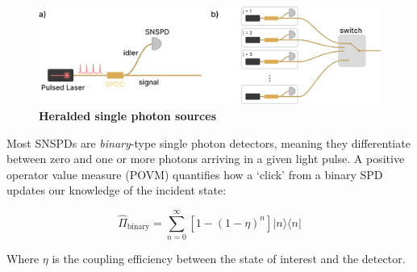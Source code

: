 \documentclass[11pt]{caltech_thesis} %
\begin{document}
\hypertarget{fig:hsps}{%
\begin{figure}
\centering
\includegraphics{chapter_05/figs_05/hsps_light.pdf}
\caption[{Heralded single photon source designs}]{\textbf{Heralded
single photon sources}}
\label{fig:hsps}
\end{figure}
}

Most SNSPDs are \emph{binary}-type single photon detectors, meaning they
differentiate between zero and one or more photons arriving in a given
light pulse. A positive operator value measure (POVM) quantifies how a
`click' from a binary SPD updates our knowledge of the incident state:

\[\hat{\Pi}_{\text {binary}} = \sum_{n=0}^{\infty}\left[1-(1-\eta)^{n}\right]|n\rangle\langle n|\]

Where \(\eta\) is the coupling efficiency between the state of interest
and the detector.
\end{document}
